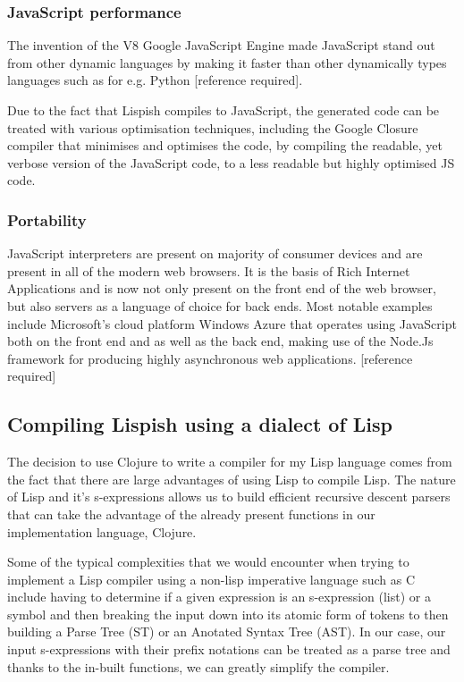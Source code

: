 \subsubsection{JavaScript performance}
The invention of the V8 Google JavaScript Engine made JavaScript stand out from other dynamic languages by making it faster than other dynamically types languages such as for e.g. Python [reference required].

Due to the fact that Lispish compiles to JavaScript, the generated code can be treated with various optimisation techniques, including the Google Closure compiler that minimises and optimises the code, by compiling the readable, yet verbose version of the JavaScript code, to a less readable but highly optimised JS code.

\subsubsection{Portability}
JavaScript interpreters are present on majority of consumer devices and are present in all of the modern web browsers. It is the basis of Rich Internet Applications and is now not only present on the front end of the web browser, but also servers as a language of choice for back ends.
Most notable examples include Microsoft's cloud platform Windows Azure that operates using JavaScript both on the front end and as well as the back end, making use of the Node.Js framework for producing highly asynchronous web applications. [reference required]

\subsection{Compiling Lispish using a dialect of Lisp}
The decision to use Clojure to write a compiler for my Lisp language comes from the fact that there are large advantages of using Lisp to compile Lisp.
The nature of Lisp and it's s-expressions allows us to build efficient recursive descent parsers that can take the advantage of the already present functions in our implementation language, Clojure.

Some of the typical complexities that we would encounter when trying to implement a Lisp compiler using a non-lisp imperative language such as C include having to determine if a given expression is an s-expression (list) or a symbol and then breaking the input down into its atomic form of tokens to then building a Parse Tree (ST) or an Anotated Syntax Tree (AST).
In our case, our input s-expressions with their prefix notations can be treated as a parse tree and thanks to the in-built functions, we can greatly simplify the compiler.

